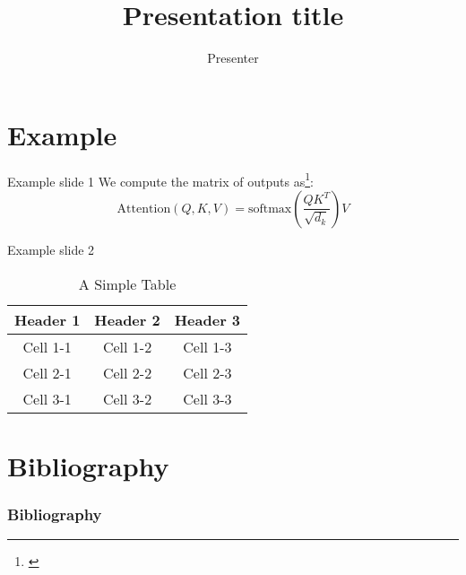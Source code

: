 \documentclass[11pt]{beamer}
\author[Presenter]{Presenter}
\title[Short title]{Presentation title}
\begin{document}
\begin{frame}
\titlepage
\end{frame}

\section{Example}

\begin{frame}{Example slide 1}
We compute the matrix of outputs as\footnote{\cite{vaswaniAttentionAllYou2023}}:
$$
	\mathrm{Attention}(Q, K, V) = \mathrm{softmax}(\frac{QK^T}{\sqrt{d_k}})V
$$
\end{frame}

\begin{frame}{Example slide 2}
	\begin{table}
	  \centering
	  \begin{tabular}{|c|c|c|}
		\hline
		\textbf{Header 1} & \textbf{Header 2} & \textbf{Header 3} \\
		\hline
		Cell 1-1 & Cell 1-2 & Cell 1-3 \\
		\hline
		Cell 2-1 & Cell 2-2 & Cell 2-3 \\
		\hline
		Cell 3-1 & Cell 3-2 & Cell 3-3 \\
		\hline
	  \end{tabular}
	  \caption{A Simple Table}
	\end{table}
\end{frame}

\section{Bibliography}

\begin{frame}[t,allowframebreaks]
\frametitle{Bibliography}
\printbibliography
\end{frame}
\end{document}
